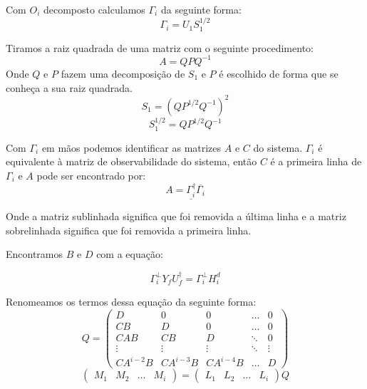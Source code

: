 Com $O_i$ decomposto calculamos $\Gamma_i$ da seguinte forma:
\begin{equation}\label{eq:gammai}
\Gamma_i=U_1 S_1^{1/2}
\end{equation}

Tiramos a raiz quadrada de uma matriz com o seguinte procedimento:
\begin{equation}
A=QPQ^{-1}
\end{equation}
Onde $Q$ e $P$ fazem uma decomposição de $S_1$ e $P$ é escolhido de forma que se conheça a sua raiz quadrada.
\begin{equation}
S_1=(QP^{1/2}Q^{-1})^2
\end{equation}
\begin{equation} \label{eq:raizs1}
S_1^{1/2}=QP^{1/2}Q^{-1}
\end{equation}

Com $\Gamma_i$ em mãos podemos identificar as matrizes $A$ e $C$ do sistema. $\Gamma_i$ é equivalente à matriz de observabilidade do sistema, então $C$ é a primeira linha de $\Gamma_i$ e $A$ pode ser encontrado por:
\begin{equation}\label{eq:matriza}
A=\underline{\Gamma_i^\dagger}\overline{\Gamma_i}
\end{equation}

Onde a matriz sublinhada significa que foi removida a última linha e a matriz sobrelinhada significa que foi removida a primeira linha.


Encontramos $B$ e $D$ com a equação:

\begin{equation}
\Gamma_i ^\perp Y_f U_f ^\dagger=\Gamma_i ^\perp H^d_i
\end{equation}

Renomeamos os termos dessa equação da seguinte forma:
\begin{equation}
Q=\begin{pmatrix}
D& 0 & 0 & \dots & 0\\
CB & D & 0 & \dots & 0\\
CAB & CB & D & \ddots & 0\\
\vdots & \vdots & \vdots & \ddots & \vdots\\
CA^{i-2}B & CA^{i-3}B & CA^{i-4}B& \dots & D
\end{pmatrix}
\end{equation}
\begin{equation}
\begin{pmatrix}
M_1 & M_2 & \dots & M_i
\end{pmatrix}
=
\begin{pmatrix}
L_1 & L_2 & \dots & L_i
\end{pmatrix}Q
\end{equation}

